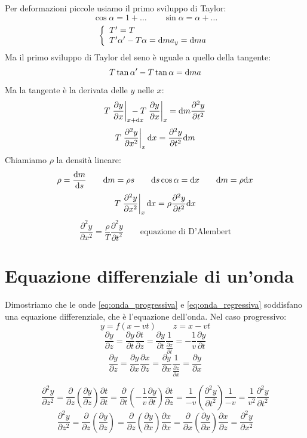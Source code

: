 Per deformazioni piccole usiamo il primo sviluppo di Taylor:
\[\cos \alpha=1+\ldots\qquad \sin \alpha=\alpha+\ldots\]
\[\left\{\begin{array}{l}
      T'=T                                \\
      T'\alpha'-T\alpha=\mathrm{d} m a_y=\mathrm{d} m a \\
   \end{array}\right.\]
Ma il primo sviluppo di Taylor del seno è uguale a quello della tangente:
\[T\tan\alpha'-T\tan\alpha=\mathrm{d} m a\]
Ma la tangente è la derivata delle $y$ nelle $x$:
\[T\left.\frac{\partial y}{\partial x}\right |_{x+\ud x}\!\!\!\!\!\!\!\!\!\!-T\left.\frac{\partial y}{\partial x}\right|_{x}=\ud m\frac{\partial^2 y}{\partial t^2}\]
\[T\left.\frac{\partial^2 y}{\partial x^2}\right|_x\mathrm{d} x=\frac{\partial^2 y}{\partial t^2}\mathrm{d} m\]
Chiamiamo $\rho$ la densità lineare:
\[\rho=\frac{\mathrm{d} m}{\mathrm{d} s}\qquad \mathrm{d} m=\rho s\qquad \mathrm{d} s\cos\alpha=\mathrm{d} x\qquad\mathrm{d} m=\rho\mathrm{d} x\]
\[T\left.\frac{\partial^2 y}{\partial x^2}\right|_x\mathrm{d} x=\rho\frac{\partial^2 y}{\partial t^2}\mathrm{d} x\]
\[\frac{\partial^2 y}{\partial x^2}=\frac{\rho}{T}\frac{\partial^2 y}{\partial t^2}\qquad\text{equazione di D'Alembert}\]

\parbox[]{\textwidth}{
   \section{Equazione differenziale di un'onda}
   Dimostriamo che le onde \eqref{eq:onda_progressiva} e \eqref{eq:onda_regressiva} soddisfano una equazione differenziale, che è l'equazione dell'onda. Nel caso progressivo:
   \[y=f(x-vt)\qquad z=x-vt\]
   \[\frac{\partial y}{\partial z}=\frac{\partial y}{\partial t}\frac{\partial t}{\partial z}=\frac{\partial y}{\partial t}\frac{1}{\frac{\partial z}{\partial t}}=-\frac{1}{v}\frac{\partial y}{\partial t}\]
   \[\frac{\partial y}{\partial z}=\frac{\partial y}{\partial x}\frac{\partial x}{\partial z}=\frac{\partial y}{\partial x}\frac{1}{\frac{\partial z}{\partial x}}=\frac{\partial y}{\partial x}\]
}

\[\frac{\partial^2 y}{\partial z^2}=\frac{\partial}{\partial z}\left(\frac{\partial y}{\partial z}\right)\frac{\partial t}{\partial t}=\frac{\partial}{\partial t}\left(-\frac{1}{v}\frac{\partial y}{\partial t}\right)\frac{\partial t}{\partial z}=\frac{1}{-v}\left(\frac{\partial^2 y}{\partial t^2}\right)\frac{1}{-v}=\frac{1}{v^2}\frac{\partial^2 y}{\partial t^2}\]
\[\frac{\partial^2 y}{\partial z^2}=\frac{\partial}{\partial z}\left(\frac{\partial y}{\partial z}\right)=\frac{\partial}{\partial z}\left(\frac{\partial y}{\partial x}\right)\frac{\partial x}{\partial x}=\frac{\partial}{\partial x}\left(\frac{\partial y}{\partial x}\right)\frac{\partial x}{\partial z}=\frac{\partial^2 y}{\partial x^2}\]


